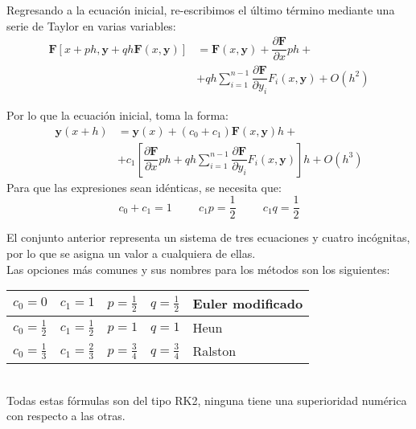 \begin{frame}
Regresando a la ecuación inicial, re-escribimos el último término mediante una serie de Taylor en varias variables:
\[ \begin{split}
 \mathbf{F}[x+ph, \mathbf{y}+qh \mathbf{F}(x,\mathbf{y})] &= \mathbf{F}(x,\mathbf{y}) + \dfrac{\partial \mathbf{F}}{\partial x} ph + \\
 &+ qh \sum_{i=1}^{n-1} \dfrac{\partial \mathbf{F}}{\partial y_{i}} F_{i}(x,\mathbf{y}) + O(h^{2}) 
\end{split} \]
\end{frame}
\begin{frame}
Por lo que la ecuación inicial, toma la forma:
\[  \begin{split}
\mathbf{y}(x+h) &= \mathbf{y}(x) + (c_{0}+c_{1})\mathbf{F}(x,\mathbf{y})h + \\
&+ c_{1} \left[ \dfrac{\partial \mathbf{F}}{\partial x} ph + qh \sum_{i=1}^{n-1} \dfrac{\partial \mathbf{F}}{\partial y_{i}} F_{i}(x,\mathbf{y}) \right] h + O(h^{3}) 
\end{split} \]
Para que las expresiones sean idénticas, se necesita que:
\[ c_{0}+c_{1}= 1 \hspace{1cm} c_{1}p = \dfrac{1}{2} \hspace{1cm} c_{1}q = \dfrac{1}{2}\]
\end{frame}
\begin{frame}
El conjunto anterior representa un sistema de tres ecuaciones y cuatro incógnitas, por lo que se asigna un valor a cualquiera de ellas.
\\
\medskip
Las opciones más comunes y sus nombres para los métodos son los siguientes:
\\
\bigskip
\begin{tabular}{l | l | l | l | l}
$c_{0}=0$ & $c_{1}=1$ & $p=\frac{1}{2}$ & $q=\frac{1}{2}$ & Euler modificado \\ \hline
$c_{0}=\frac{1}{2}$ & $c_{1}=\frac{1}{2}$ & $p=1$ & $q=1$ & Heun \\ \hline
$c_{0}=\frac{1}{3}$ & $c_{1}=\frac{2}{3}$ & $p=\frac{3}{4}$ & $q=\frac{3}{4}$ & Ralston
\end{tabular}
\\
\medskip
Todas estas fórmulas son del tipo RK2, ninguna tiene una superioridad numérica con respecto a las otras.
\end{frame}
